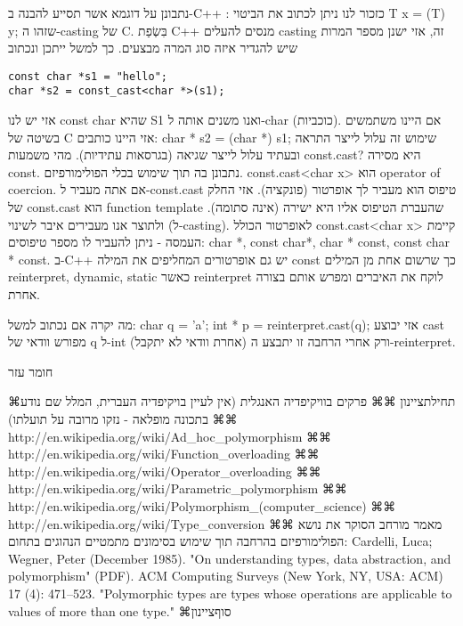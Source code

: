         נתבונן על דוגמא אשר תסייע להבנה ב-C++ :
        כזכור לנו ניתן לכתוב את הביטוי T x = (T) y; שזהו ה-casting של C. בִּשְׂפַת C++ מנסים להעלים casting זה, אזי ישנן מספר המרות שיש להגדיר איזה סוג המרה מבצעים. כך למשל ייתכן ונכתוב

\begin{verbatim}
const char *s1 = "hello";
char *s2 = const_cast<char *>(s1);
\end{verbatim}

        אזי יש לנו const char שהיא S1 ואנו משנים אותה ל-char (כוכביות). אם היינו משתמשים בשיטה של C אזי היינו כותבים:
        char * s2 = (char *) s1;
        שימוש זה עלול לייצר התראה ובעתיד עלול לייצר שגיאה (בגרסאות עתידיות).
        מהי משמעות const.cast? היא מסירה const. נתבונן בה תוך שימוש בכלי הפולימורפיזם.
        const.cast<char x> הוא operator of coercion. אם אתה מעביר ל-const.cast טיפוס הוא מעביר לך אופרטור (פונקציה). אזי החלק של const.cast הוא function template שהעברת הטיפוס אליו היא ישירה (אינה סתומה). ולתוצר אנו מעבירים איבר לשינוי (ל-casting). לאופרטור הכולל const.cast<char x> קיימת העמסה - ניתן להעביר לו מספר טיפוסים: char *, const char*, char * const, const char * const.
        ב-C++ יש גם אופרטורים המחליפים את המילה const כך שרשום אחת מן המילים reinterpret, dynamic, static כאשר reinterpret לוקח את האיברים ומפרש אותם בצורה אחרת.

        מה יקרה אם נכתוב למשל:
        char q = 'a';
        int * p = reinterpret.cast(q);
        אזי יבוצע cast מפורש וודאי של q ל-int (אחרת וודאי לא יתקבל) ורק אחרי הרחבה זו יתבצע ה-reinterpret.

        חומר עזר

        ⌘תחילת{ציינון}
        ⌘⌘ פרקים בוויקיפדיה האנגלית (אין לעיין בויקיפדיה העברית, המלל שם נודע בתכונה מופלאה - נזקו מרובה על תועלתו)
        ⌘⌘ http://en.wikipedia.org/wiki/Ad\_hoc\_polymorphism
        ⌘⌘ http://en.wikipedia.org/wiki/Function\_overloading
        ⌘⌘ http://en.wikipedia.org/wiki/Operator\_overloading
        ⌘⌘ http://en.wikipedia.org/wiki/Parametric\_polymorphism
        ⌘⌘ http://en.wikipedia.org/wiki/Polymorphism\_(computer\_science)
        ⌘⌘ http://en.wikipedia.org/wiki/Type\_conversion
        ⌘⌘ מאמר מורחב הסוקר את נושא הפולימורפיזם בהרחבה תוך שימוש בסימונים מתמטיים הנהוגים בתחום:
        Cardelli, Luca; Wegner, Peter (December 1985). "On understanding types, data abstraction, and polymorphism" (PDF). ACM Computing Surveys (New York, NY, USA: ACM) 17 (4): 471–523. "Polymorphic types are types whose operations are applicable to values of more than one type."
    ⌘סוף{ציינון}

